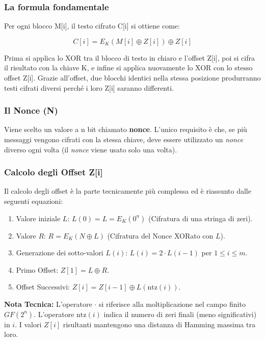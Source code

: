 \documentclass{article}
\begin{document}
\vspace{0.5cm}

\subsubsection*{La formula fondamentale}
Per ogni blocco M[i], il testo cifrato C[i] si ottiene come:

\begin{equation*}
    C[i] = E_K(M[i] \oplus Z[i]) \oplus Z[i]
\end{equation*}

Prima si applica lo XOR tra il blocco di testo in chiaro e l'offset Z[i], poi si cifra il risultato con la chiave K, e infine si applica nuovamente lo XOR con lo stesso offset Z[i]. Grazie all'offset, due blocchi identici nella stessa posizione produrranno testi cifrati diversi perché i loro Z[i] saranno differenti.

\subsubsection*{Il Nonce (N)}
Viene scelto un valore a n bit chiamato \textbf{nonce}. L'unico requisito è che, se più messaggi vengono cifrati con la stessa chiave, deve essere utilizzato un \textit{nonce} diverso ogni volta (il \textit{nonce} viene usato solo una volta).

\subsubsection*{Calcolo degli Offset Z[i]}
Il calcolo degli offset è la parte tecnicamente più complessa ed è riassunto dalle seguenti equazioni:

\begin{enumerate}
    \item Valore iniziale $L$: $L(0) = L = E_K(0^n)$ (Cifratura di una stringa di zeri).
    \item Valore $R$: $R = E_K(N \oplus L)$ (Cifratura del Nonce XORato con $L$).
    \item Generazione dei sotto-valori $L(i)$: $L(i) = 2 \cdot L(i - 1)$ per $1 \le i \le m$.
    \item Primo Offset: $Z[1] = L \oplus R$.
    \item Offset Successivi: $Z[i] = Z[i - 1] \oplus L(\text{ntz}(i))$.
\end{enumerate}

\textbf{Nota Tecnica:} L'operatore $\cdot$ si riferisce alla moltiplicazione nel campo finito $GF(2^n)$. L'operatore $\text{ntz}(i)$ indica il numero di zeri finali (meno significativi) in $i$. I valori $Z[i]$ risultanti mantengono una distanza di Hamming massima tra loro.
\end{document}
